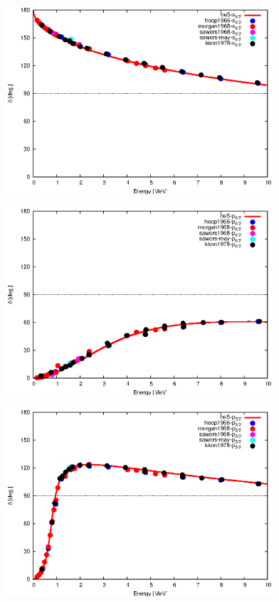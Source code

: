 \documentclass[english,a4paper]{jsarticle}
\begin{document}
\begin{figure}
\centering
\includegraphics[height=7cm,width=10cm]{../phs_exp_com_s1.eps}
\end{figure}
\begin{figure}
\centering
\includegraphics[height=7cm,width=10cm]{../phs_exp_com_p1.eps}
\end{figure}
\begin{figure}
\centering
\includegraphics[height=7cm,width=10cm]{../phs_exp_com_p3.eps}
\end{figure}
\end{document}
